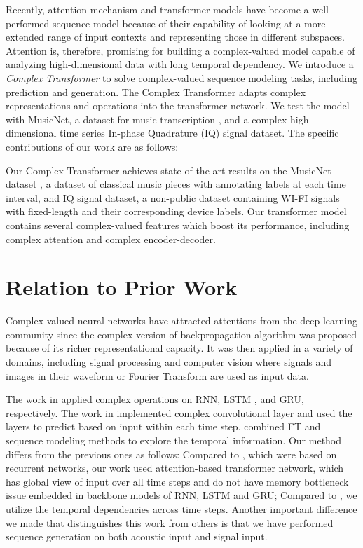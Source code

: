 \documentclass{article}
\begin{document}
Recently, attention mechanism \cite{bahdanau2014neural, cho2014learning} and transformer models \cite{vaswani2017attention, yang2019xlnet} have become a well-performed sequence model because of their capability of looking at a more extended range of input contexts and representing those in different subspaces. Attention is, therefore, promising for building a complex-valued model capable of analyzing high-dimensional data with long temporal dependency. We introduce a \textit{Complex Transformer} to solve complex-valued sequence modeling tasks, including prediction and generation. The Complex Transformer adapts complex representations and operations into the transformer network. We test the model with MusicNet, a dataset for music transcription \cite{thickstun2016learning}, and a complex high-dimensional time series In-phase Quadrature (IQ) signal dataset. The specific contributions of our work are as follows: 

Our Complex Transformer achieves state-of-the-art results on the MusicNet dataset \cite{thickstun2016learning}, a dataset of classical music pieces with annotating labels at each time interval, and IQ signal dataset, a non-public dataset containing WI-FI signals with fixed-length and their corresponding device labels. Our transformer model contains several complex-valued features which boost its performance, including complex attention and complex encoder-decoder.



\section{Relation to Prior Work}
Complex-valued neural networks have attracted attentions from the deep learning community since the complex version of backpropagation algorithm \cite{benvenuto1992complex} was proposed because of its richer representational capacity. It was then applied in a variety of domains, including signal processing \cite{you1998nonlinear} and computer vision \cite{oyallon2015deep} where signals and images in their waveform or Fourier Transform are used as input data.

The work in \cite{arjovsky2016unitary, danihelka2016associative, wolter2018complex} applied complex operations on RNN, LSTM \cite{hochreiter1997long}, and GRU\cite{cho2014learning}, respectively. The work in \cite{trabelsi2017deep} implemented complex convolutional layer and used the layers to predict based on input within each time step. \cite{wolterfrnn} combined FT and sequence modeling methods to explore the temporal information. Our method differs from the previous ones as follows: Compared to \cite{arjovsky2016unitary, danihelka2016associative, wolter2018complex, wolterfrnn}, which were based on recurrent networks, our work used attention-based transformer network, which has global view of input over all time steps and do not have memory bottleneck issue embedded in backbone models of RNN, LSTM and GRU; Compared to \cite{trabelsi2017deep}, we utilize the temporal dependencies across time steps. Another important difference we made that distinguishes this work from others is that we have performed sequence generation on both acoustic input and signal input. 
\end{document}
